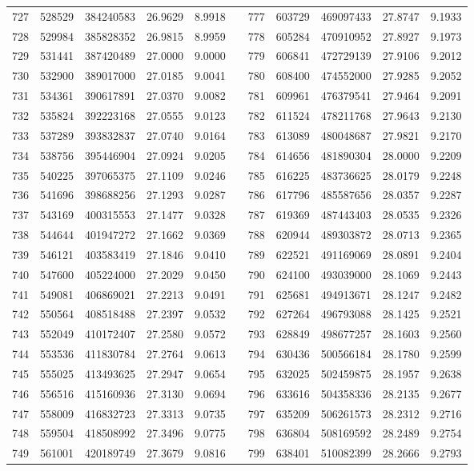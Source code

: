 \begin{longtable}{rrrrrrrrrrr}
727&528529&384240583&26.9629&8.9918&&777&603729&469097433&27.8747&9.1933\\
728&529984&385828352&26.9815&8.9959&&778&605284&470910952&27.8927&9.1973\\
729&531441&387420489&27.0000&9.0000&&779&606841&472729139&27.9106&9.2012\\
730&532900&389017000&27.0185&9.0041&&780&608400&474552000&27.9285&9.2052\\
731&534361&390617891&27.0370&9.0082&&781&609961&476379541&27.9464&9.2091\\
732&535824&392223168&27.0555&9.0123&&782&611524&478211768&27.9643&9.2130\\
733&537289&393832837&27.0740&9.0164&&783&613089&480048687&27.9821&9.2170\\
734&538756&395446904&27.0924&9.0205&&784&614656&481890304&28.0000&9.2209\\
735&540225&397065375&27.1109&9.0246&&785&616225&483736625&28.0179&9.2248\\
736&541696&398688256&27.1293&9.0287&&786&617796&485587656&28.0357&9.2287\\
737&543169&400315553&27.1477&9.0328&&787&619369&487443403&28.0535&9.2326\\
738&544644&401947272&27.1662&9.0369&&788&620944&489303872&28.0713&9.2365\\
739&546121&403583419&27.1846&9.0410&&789&622521&491169069&28.0891&9.2404\\
740&547600&405224000&27.2029&9.0450&&790&624100&493039000&28.1069&9.2443\\
741&549081&406869021&27.2213&9.0491&&791&625681&494913671&28.1247&9.2482\\
742&550564&408518488&27.2397&9.0532&&792&627264&496793088&28.1425&9.2521\\
743&552049&410172407&27.2580&9.0572&&793&628849&498677257&28.1603&9.2560\\
744&553536&411830784&27.2764&9.0613&&794&630436&500566184&28.1780&9.2599\\
745&555025&413493625&27.2947&9.0654&&795&632025&502459875&28.1957&9.2638\\
746&556516&415160936&27.3130&9.0694&&796&633616&504358336&28.2135&9.2677\\
747&558009&416832723&27.3313&9.0735&&797&635209&506261573&28.2312&9.2716\\
748&559504&418508992&27.3496&9.0775&&798&636804&508169592&28.2489&9.2754\\
749&561001&420189749&27.3679&9.0816&&799&638401&510082399&28.2666&9.2793\\

\end{longtable}
